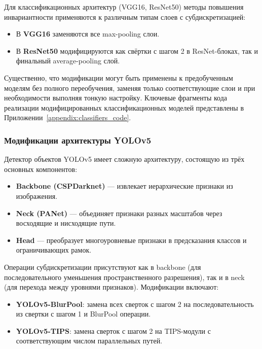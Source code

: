 Для классификационных архитектур (VGG16, ResNet50) методы повышения инвариантности применяются к различным типам слоев с субдискретизацией:

\begin{itemize}
    \item В \textbf{VGG16} заменяются все max-pooling слои.
    \item В \textbf{ResNet50} модифицируются как свёртки с шагом 2 в ResNet-блоках, так и финальный average-pooling слой.
\end{itemize}

Существенно, что модификации могут быть применены к предобученным моделям без полного переобучения, заменяя только соответствующие слои и при необходимости выполняя тонкую настройку. Ключевые фрагменты кода реализации модифицированных классификационных моделей представлены в Приложении~\ref{appendix:classifiers_code}.

\subsubsection{Модификации архитектуры YOLOv5}
\label{sec:architectures:yolo}

Детектор объектов YOLOv5 имеет сложную архитектуру, состоящую из трёх основных компонентов:

\begin{itemize}
    \item \textbf{Backbone (CSPDarknet)} — извлекает иерархические признаки из изображения.
    \item \textbf{Neck (PANet)} — объединяет признаки разных масштабов через восходящие и нисходящие пути.
    \item \textbf{Head} — преобразует многоуровневые признаки в предсказания классов и ограничивающих рамок.
\end{itemize}

Операции субдискретизации присутствуют как в backbone (для последовательного уменьшения пространственного разрешения), так и в neck (для перехода между уровнями признаков). Модификации включают:

\begin{itemize}
    \item \textbf{YOLOv5-BlurPool}: замена всех сверток с шагом 2 на последовательность из свертки с шагом 1 и BlurPool операции.
    \item \textbf{YOLOv5-TIPS}: замена сверток с шагом 2 на TIPS-модули с соответствующим числом параллельных путей.
\end{itemize}

